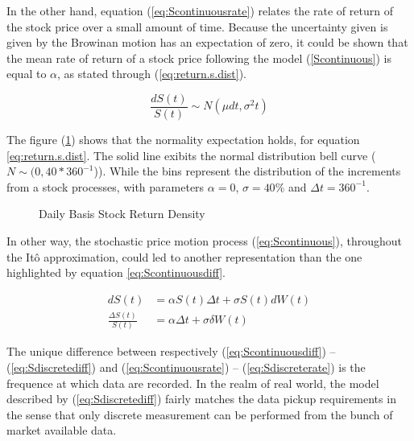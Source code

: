 \documentclass[12pt]{report}
\newcommand{\dBm}{dW\left(t\right)}
\newcommand{\DBm}{\delta{W\left(t\right)}}
\newcommand{\Dt}{\Delta t}
\newcommand{\St}{S\left(t\right)}
\newcommand{\dSt}{dS\left(t\right)}
\newcommand{\DSt}{\Delta S\left(t\right)}
\newcommand{\dSr}{\frac{\dSt}{\St}}
\newcommand{\DSr}{\frac{\DSt}{\St}}
\newcommand{\Sdiscretediff}{d\St &= \alpha \St \Dt + \sigma \St \dBm}
\newcommand{\Sdiscreterate}{\DSr &= \alpha \Delta t + \sigma \DBm}
\begin{document}
In the other hand, equation (\ref{eq:Scontinuousrate}) relates the rate of return of the stock price over a small amount of time. Because the uncertainty given is given by the Browinan motion has an expectation of zero, it could be shown that the mean rate of return of a stock price following the model (\ref{Scontinuous}) is equal to $\alpha$, as stated through (\ref{eq:return.s.dist}).

\begin{center}
  \begin{equation}
     \dSr \sim N(\mu dt, \sigma^2 t)
     \label{eq:return.s.dist}
  \end{equation}
\end{center}


The figure (\ref{plot:returnDensity}) shows that the normality expectation holds, for equation \ref{eq:return.s.dist}. The solid line exibits the normal distribution bell curve ($N \sim (0, 40 * 360^{-1}$)). While the bins represent the distribution of the increments from a stock processes, with parameters $\alpha = 0$, $\sigma = 40\%$ and $\Dt = 360^{-1}$.

 
\begin{figure}[!h]
\centering

\caption{Daily Basis Stock Return Density}
\label{plot:returnDensity}
\end{figure}



In other way, the stochastic price motion process (\ref{eq:Scontinuous}), throughout the Itô approximation, could led to another representation than the one highlighted by equation \ref{eq:Scontinuousdiff}.

\begin{center}
  \begin{subequations}
    \begin{align}
      \Sdiscretediff \label{eq:Sdiscretediff} \\
      \Sdiscreterate \label{eq:Sdiscreterate}
    \end{align}
  \end{subequations}
\end{center}

The unique difference between respectively (\ref{eq:Scontinuousdiff}) -- (\ref{eq:Sdiscretediff}) and (\ref{eq:Scontinuousrate}) -- (\ref{eq:Sdiscreterate}) is the frequence at which data are recorded.
In the realm of real world, the model described by (\ref{eq:Sdiscretediff}) fairly matches the data pickup requirements in the sense that only discrete measurement can be performed from the bunch of market available data.
 
\end{document}
